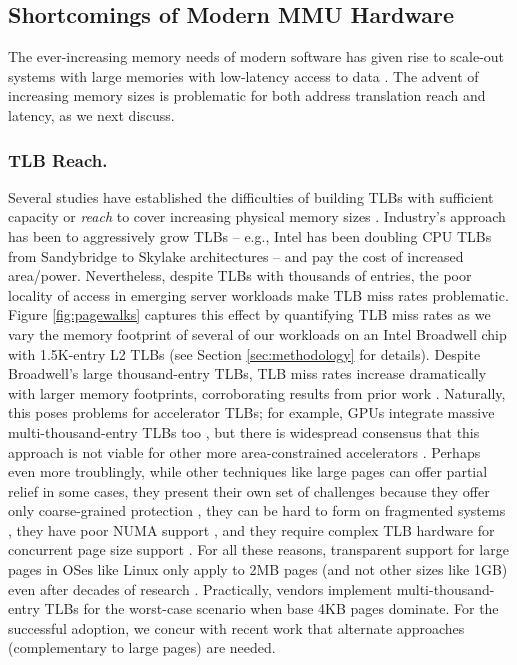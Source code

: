 \subsection{Shortcomings of Modern MMU Hardware}
The ever-increasing memory needs of modern software has given rise to
scale-out systems with large memories with low-latency access to data
\cite{ferdman:clearing, karakostas:performance, volos:fat,
  basu:efficient}. The advent of increasing memory sizes is
problematic for both address translation reach and latency, as we next
discuss.

\subsubsection{TLB Reach.}
Several studies have established the difficulties of building TLBs
with sufficient capacity or {\it reach} to cover increasing physical
memory sizes \cite{basu:efficient, haria:devirtualizing,
  pham:colt}. Industry's approach has been to aggressively grow TLBs
-- e.g., Intel has been doubling CPU TLBs from Sandybridge to Skylake
architectures -- and pay the cost of increased
area/power. Nevertheless, despite TLBs with thousands of entries, the
poor locality of access in emerging server workloads make TLB miss
rates problematic. Figure \ref{fig:pagewalks} captures this effect by
quantifying TLB miss rates as we vary the memory footprint of several
of our workloads on an Intel Broadwell chip with 1.5K-entry L2 TLBs
(see Section \ref{sec:methodology} for details). Despite Broadwell's
large thousand-entry TLBs, TLB miss rates increase dramatically with
larger memory footprints, corroborating results from prior work
\cite{basu:efficient}. Naturally, this poses problems for accelerator
TLBs; for example, GPUs integrate massive multi-thousand-entry TLBs
too \cite{vesely:observation, lowepower:inferring}, but there is
widespread consensus that this approach is not viable for other more
area-constrained accelerators \cite{haria:devirtualizing,
  picorel:near-memory}. Perhaps even more troublingly, while other
techniques like large pages can offer partial relief in some cases,
they present their own set of challenges because they offer only
coarse-grained protection \cite{pham:large}, they can be hard to form
on fragmented systems \cite{kwon:coordinated}, they have poor NUMA
support \cite{gaud:large}, and they require complex TLB hardware for
concurrent page size support \cite{cox:efficient}. For all these
reasons, transparent support for large pages in OSes like Linux only
apply to 2MB pages (and not other sizes like 1GB) even after decades
of research \cite{arcangeli:transparent}. Practically, vendors
implement multi-thousand-entry TLBs for the worst-case scenario when
base 4KB pages dominate. For the successful adoption, we concur with
recent work \cite{pham:colt, basu:efficient, karakostas:redundant,
  haria:devirtualizing} that alternate approaches (complementary to
large pages) are needed.

